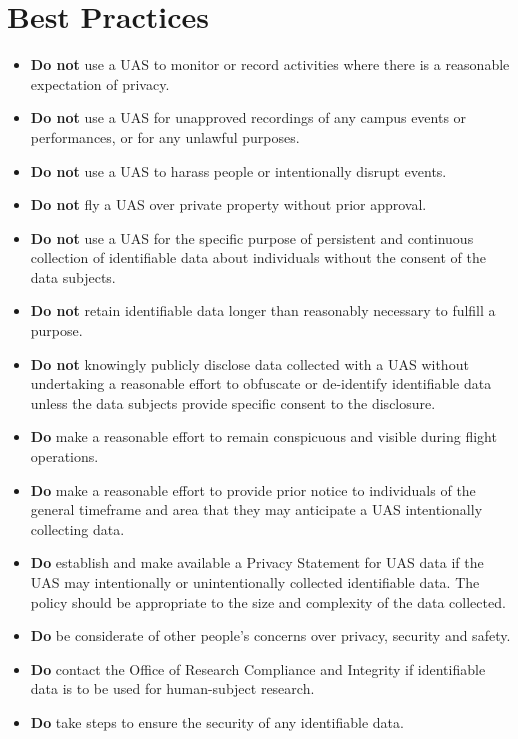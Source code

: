 \documentclass[
]{book}
\begin{document}
\hypertarget{best-practices}{%
\section{Best Practices}\label{best-practices}}

\begin{itemize}
\item
  \textbf{Do not} use a UAS to monitor or record activities where there is a reasonable expectation of privacy.
\item
  \textbf{Do not} use a UAS for unapproved recordings of any campus events or performances, or for any unlawful purposes.
\item
  \textbf{Do not} use a UAS to harass people or intentionally disrupt events.
\item
  \textbf{Do not} fly a UAS over private property without prior approval.
\item
  \textbf{Do not} use a UAS for the specific purpose of persistent and continuous collection of identifiable data about individuals without the consent of the data subjects.
\item
  \textbf{Do not} retain identifiable data longer than reasonably necessary to fulfill a purpose.
\item
  \textbf{Do not} knowingly publicly disclose data collected with a UAS without undertaking a reasonable effort to obfuscate or de-identify identifiable data unless the data subjects provide specific consent to the disclosure.
\item
  \textbf{Do} make a reasonable effort to remain conspicuous and visible during flight operations.
\item
  \textbf{Do} make a reasonable effort to provide prior notice to individuals of the general timeframe and area that they may anticipate a UAS intentionally collecting data.
\item
  \textbf{Do} establish and make available a Privacy Statement for UAS data if the UAS may intentionally or unintentionally collected identifiable data. The policy should be appropriate to the size and complexity of the data collected.
\item
  \textbf{Do} be considerate of other people's concerns over privacy, security and safety.
\item
  \textbf{Do} contact the Office of Research Compliance and Integrity if identifiable data is to be used for human-subject research.
\item
  \textbf{Do} take steps to ensure the security of any identifiable data.
\end{itemize}
\end{document}
